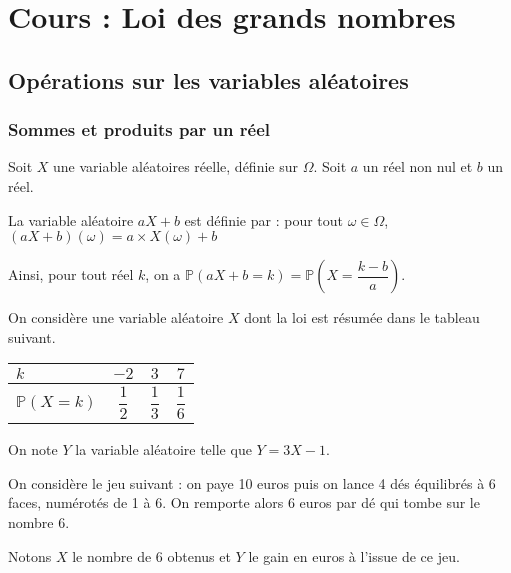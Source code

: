 \documentclass[11pt,fleqn, openany]{book} %
\begin{document}

\chapter{Cours : Loi des grands nombres}


\section{Opérations sur les variables aléatoires}

\subsection{Sommes et produits par un réel}

\begin{definition}Soit $X$ une variable aléatoires réelle, définie sur $\Omega$. Soit $a$ un réel non nul et $b$ un réel. 

La variable aléatoire $aX+b$ est définie par : pour tout $\omega \in \Omega$, $(aX+b)(\omega) = a \times X(\omega) +b$

Ainsi, pour tout réel $k$, on a $\mathbb{P}(aX+b=k) = \mathbb{P}\left( X = \dfrac{k-b}{a} \right)$.\end{definition}

\begin{example}On considère une variable aléatoire $X$ dont la loi est résumée dans le tableau suivant.

\renewcommand{\arraystretch}{2.2}
\begin{center}
\begin{tabular}{|l|c|c|c|}
\hline
$k$ & $-2$& $3$ & $7$ \\
\hline
$\mathbb{P}(X=k)$ & $\dfrac{1}{2}$ & $\dfrac{1}{3}$ & $\dfrac{1}{6}$\\
\hline \end{tabular}
\end{center}
On note $Y$ la variable aléatoire telle que $Y=3X-1$.
\vskip50pt
\end{example}


\begin{example}On considère le jeu suivant : on paye 10 euros puis on lance 4 dés équilibrés à 6 faces, numérotés de 1 à 6. On remporte alors 6 euros par dé qui tombe sur le nombre 6.

Notons $X$ le nombre de 6 obtenus et $Y$ le gain en euros à l'issue de ce jeu. 
\vskip80pt
\end{example}
\end{document}
